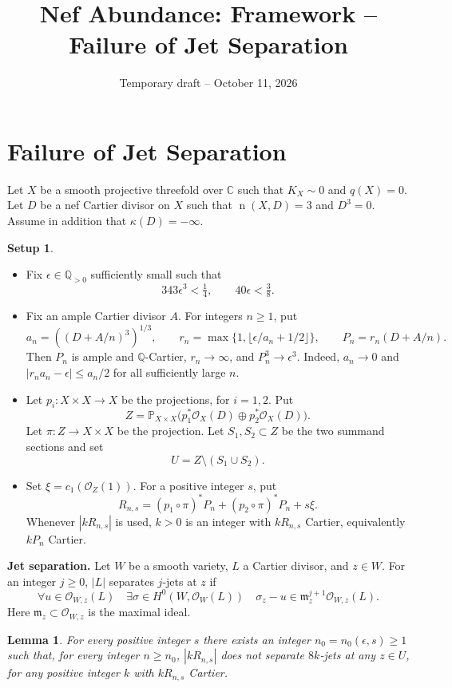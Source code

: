 \documentclass[12pt,a4paper,psamsfonts]{amsart}
\title{Nef Abundance: Framework -- Failure of Jet Separation}
\date{Temporary draft -- October 11, 2026}
\theoremstyle{definition}
\newtheorem*{setup}{Setup}
\theoremstyle{plain}
\newtheorem{lemma}{Lemma}[section]
\newcommand{\Q}{\mathbb Q}
\newcommand{\C}{\mathbb C}
\newcommand{\OO}{\mathcal O}
\newcommand{\nef}{\operatorname{n}}
\begin{document}
\maketitle

\section{Failure of Jet Separation}

Let $X$ be a smooth projective threefold over $\C$ such that
$K_X\sim0$ and $q(X)=0$. Let $D$ be a nef Cartier divisor on $X$
such that $\nef(X,D)=3$ and $D^3=0$.
Assume in addition that $\kappa(D)=-\infty$.

\begin{setup}
\leavevmode
\begin{itemize}
\setlength{\itemsep}{2pt}
\setlength{\parsep}{0pt}
\item Fix $\epsilon\in\Q_{>0}$ sufficiently small such that
\[
 343\epsilon^3<\tfrac14,\qquad40\epsilon<\tfrac38.
\]
\item Fix an ample Cartier divisor $A$.
For integers $n\ge1$, put
\[
 a_n=((D+A/n)^3)^{1/3},\qquad
 r_n=\max\{1,\lfloor\epsilon/a_n+1/2\rfloor\},\qquad
 P_n=r_n(D+A/n).
\]
Then $P_n$ is ample and $\mathbb{Q}$-Cartier, $r_n\to\infty$, and
$P_n^3\to\epsilon^3$. Indeed, $a_n\to0$ and
$|r_na_n-\epsilon|\le a_n/2$ for all sufficiently large $n$.
\item Let $p_i:X\times X\to X$ be the projections, for $i=1,2$.
Put
\[
 Z=\mathbb P_{X\times X}
       \bigl(p_1^*\OO_X(D)\oplus p_2^*\OO_X(D)\bigr).
\]
Let $\pi:Z\to X\times X$ be the projection.
Let $S_1,S_2\subset Z$ be the two summand sections and set
\[
 U=Z\setminus(S_1\cup S_2).
\]
\item Set $\xi=c_1(\OO_Z(1))$. For a positive integer $s$, put
\[
 R_{n,s}=(p_1\circ\pi)^*P_n+(p_2\circ\pi)^*P_n+s\xi.
\]
Whenever $|kR_{n,s}|$ is used, $k>0$ is an integer with
$kR_{n,s}$ Cartier, equivalently $kP_n$ Cartier.
\end{itemize}

\end{setup}

\medskip
\noindent\textbf{Jet separation.}
Let $W$ be a smooth variety, $L$ a Cartier divisor, and $z\in W$.
For an integer $j\ge0$, $|L|$ separates $j$-jets at $z$ if
\[
 \forall u\in\OO_{W,z}(L)\quad
 \exists\sigma\in H^0(W,\OO_W(L))\quad
 \sigma_z-u\in\mathfrak m_z^{j+1}\OO_{W,z}(L).
\]
Here $\mathfrak m_z\subset\OO_{W,z}$ is the maximal ideal.

\setcounter{lemma}{1}
\begin{lemma}\label{lem:full-nojets}
For every positive integer $s$ there exists
an integer $n_0=n_0(\epsilon,s)\ge1$ such that, for every integer
$n\ge n_0$, $|kR_{n,s}|$ does not separate $8k$-jets at any $z\in U$,
for any positive integer $k$ with $kR_{n,s}$ Cartier.
\end{lemma}
\end{document}
